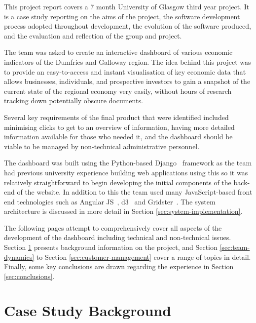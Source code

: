 \documentclass{l3proj}
\begin{document}
This project report covers a 7 month University of Glasgow third year project. It is a case study reporting on the aims of the project, the software development process adopted throughout development, the evolution of the software produced, and the evaluation and reflection of the group and project.

The team was asked to create an interactive dashboard of various economic indicators of the Dumfries and Galloway region. The idea behind this project was to provide an easy-to-access and instant visualisation of key economic data that allows businesses, individuals, and prospective investors to gain a snapshot of the current state of the regional economy very easily, without hours of research tracking down potentially obscure documents.

Several key requirements of the final product that were identified included minimising clicks to get to an overview of information, having more detailed information available for those who needed it, and the dashboard should be viable to be managed by non-technical administrative personnel.

The dashboard was built using the Python-based Django~\cite{Django} framework as the team had previous university experience building web applications using this so it was relatively straightforward to begin developing the initial components of the back-end of the website. In addition to this the team used many JavaScript-based front end technologies such as Angular JS~\cite{AngularWebpage}, d3~\cite{d3Webpage} and Gridster~\cite{AngularGridster}. The system architecture is discussed in more detail in Section \ref{sec:system-implementation}.

The following pages attempt to comprehensively cover all aspects of the development of the dashboard including technical and non-technical issues. Section \ref{sec:background} presents background information on the project, and Section \ref{sec:team-dynamics} to Section \ref{sec:customer-management} cover a range of topics in detail. Finally, some key conclusions are drawn regarding the experience in Section \ref{sec:conclusions}.

\section{Case Study Background}
\label{sec:background}
\end{document}
